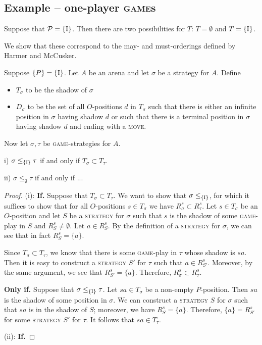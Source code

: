 \documentclass{article}
\newcommand{\game}{\textsc{game}}
\newcommand{\move}{\textsc{move}}
\newcommand{\strategy}{\textsc{strategy}}
\begin{document}
\subsection{Example -- one-player \game{}s}

Suppose that $\P=\{\RN{1}\}$.  
Then there are two possibilities for $T$: $T=\emptyset$ and $T=\{\RN{1}\}$.

We show that these correspond to the may- and must-orderings defined by Harmer and McCusker.

\begin{proposition}
  Suppose $\{P\}=\{\RN{1}\}$.  Let $A$ be an arena and let $\sigma$ be a strategy for $A$.  
  Define
  \begin{itemize}
    \item $T_\sigma$ to be the shadow of $\sigma$
    \item $D_\sigma$ to be the set of all $O$-positions $d$ in $T_\sigma$ such that there is either an infinite position in $\sigma$ having shadow $d$ or such that there is a terminal position in $\sigma$ having shadow $d$ and ending with a \move{}.
  \end{itemize}

  Now let $\sigma,\tau$ be \game{}-strategies for $A$.

  i) $\sigma \le_{\{\RN{1}\}} \tau$ if and only if $T_\sigma \subset T_\tau$.
  
  ii) $\sigma \le_\emptyset \tau$ if and only if ...
\end{proposition}

\begin{proof}

  (i): \textbf{If. }
  Suppose that $T_\sigma\subset T_\tau$.  
  We want to show that $\sigma\le_{\{\RN{1}\}}$, for which it suffices to show that for all $O$-positions $s\in T_\sigma$ we have $R_\sigma^s\subset R_\tau^s$.  
  Let $s\in T_\sigma$ be an $O$-position and let $S$ be a \strategy{} for $\sigma$ such that $s$ is the shadow of some \game{}-play in $S$ and $R_S^s\ne\emptyset$.  
  Let $a\in R_S^s$.  
  By the definition of a \strategy{} for $\sigma$, we can see that in fact $R_S^s=\{a\}$.  

  Since $T_\sigma\subset T_\tau$, we know that there is some \game{}-play in $\tau$ whose shadow is $sa$.  
  Then it is easy to construct a \strategy{} $S'$ for $\tau$ such that $a\in R_{S'}^s$.  
  Moreover, by the same argument, we see that $R_{S'}^s=\{a\}$.  
  Therefore, $R_\sigma^s\subset R_\tau^s$.  

  \textbf{Only if. }
  Suppose that $\sigma\le_{\{\RN{1}\}}\tau$.  
  Let $sa\in T_\sigma$ be a non-empty $P$-position.  
  Then $sa$ is the shadow of some position in $\sigma$.  
  We can construct a \strategy{} $S$ for $\sigma$ such that $sa$ is in the shadow of $S$; moreover, we have $R_S^s=\{a\}$.  
  Therefore, $\{a\}=R_{S'}^s$ for some \strategy{} $S'$ for $\tau$.  
  It follows that $sa\in T_\tau$.

  (ii): \textbf{If. }
  

\end{proof}
\end{document}
